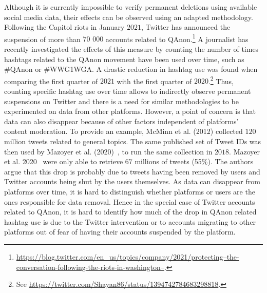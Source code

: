 \documentclass{article}
\begin{document}
Although it is currently impossible to verify permanent deletions using available social media data, their effects can be observed using an adapted methodology.
Following the Capitol riots in January $2021$, Twitter has announced the suspension of more than $70$ $000$ accounts related to QAnon.\footnote{\href{https://blog.twitter.com/en\_us/topics/company/2021/protecting--the-conversation-following-the-riots-in-washington--}{https://blog.twitter.com/en\_us/topics/company/2021/protecting--the-conversation-following-the-riots-in-washington--}.} 
A journalist has recently investigated the effects of this measure by counting the number of times hashtags related to the QAnon movement have been used over time, such as \#QAnon or \#WWG1WGA.
A drastic reduction in hashtag use was found when comparing the first quarter of $2021$ with the first quarter of $2020$.\footnote{See \href{https://twitter.com/Shayan86/status/1394742784683298818}{https://twitter.com/Shayan86/status/1394742784683298818}.}
Thus, counting specific hashtag use over time allows to indirectly observe permanent suspensions on Twitter and there is a need for similar methodologies to be experimented on data from other platforms.
However, a point of concern is that data can also disappear because of other factors independent of platforms' content moderation.
To provide an example, McMinn et al. (2012)\cite{mcminn2013building} collected $120$ million tweets related to general topics. 
The same published set of Tweet IDs was then used by Mazoyer et al. (2020)~\cite{mazoyer2020french}, to run the same collection in $2018$. Mazoyer et al. 2020~\cite{mazoyer2020french} were only able to retrieve $67$ millions of tweets (55\%). The authors argue that this drop is probably due to tweets having been removed by users and Twitter accounts being shut by the users themselves.
As data can disappear from platforms over time, it is hard to distinguish whether platforms or users are the ones responsible for data removal. 
Hence in the special case of Twitter accounts related to QAnon, it is hard to identify how much of the drop in QAnon related hashtag use is due to the Twitter intervention or to accounts migrating to other platforms out of fear of having their accounts suspended by the platform.

\smallskip 
\end{document}

